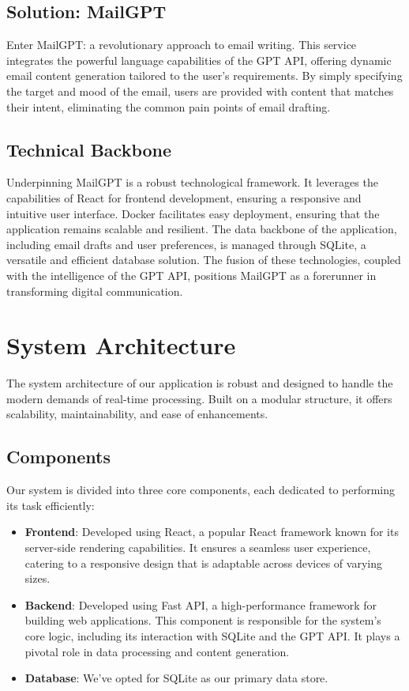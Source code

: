 \documentclass[12pt]{article}
\begin{document}
\subsection{Solution: MailGPT}

Enter MailGPT: a revolutionary approach to email writing. This service integrates the powerful language capabilities of the GPT API, offering dynamic email content generation tailored to the user's requirements. By simply specifying the target and mood of the email, users are provided with content that matches their intent, eliminating the common pain points of email drafting.

\subsection{Technical Backbone}

Underpinning MailGPT is a robust technological framework. It leverages the capabilities of React for frontend development, ensuring a responsive and intuitive user interface. Docker facilitates easy deployment, ensuring that the application remains scalable and resilient. The data backbone of the application, including email drafts and user preferences, is managed through SQLite, a versatile and efficient database solution. The fusion of these technologies, coupled with the intelligence of the GPT API, positions MailGPT as a forerunner in transforming digital communication.


\section{System Architecture}

The system architecture of our application is robust and designed to handle the modern demands of real-time processing. Built on a modular structure, it offers scalability, maintainability, and ease of enhancements.

\subsection{Components}
Our system is divided into three core components, each dedicated to performing its task efficiently:
\begin{itemize}
	\item \textbf{Frontend}: Developed using React, a popular React framework known for its server-side rendering capabilities. It ensures a seamless user experience, catering to a responsive design that is adaptable across devices of varying sizes.
	      	          
	\item \textbf{Backend}: Developed using Fast API, a high-performance framework for building web applications. This component is responsible for the system's core logic, including its interaction with SQLite and the GPT API. It plays a pivotal role in data processing and content generation.
	      	          
	\item \textbf{Database}: We've opted for SQLite as our primary data store. 
\end{itemize}
\end{document}
